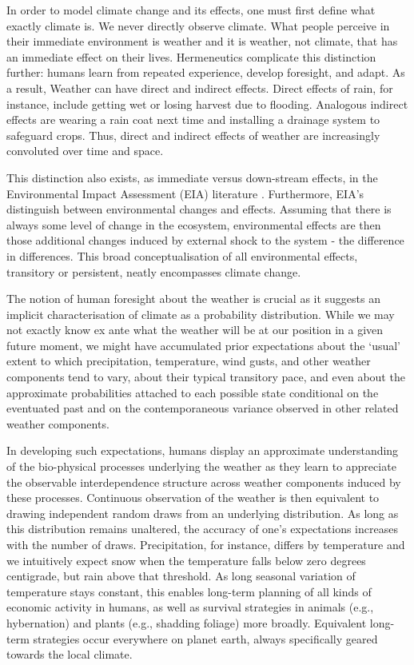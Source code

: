 \documentclass[a4paper,12pt]{article}
\theoremstyle{plain}
\theoremstyle{definition}
\theoremstyle{definition}
\theoremstyle{definition}
\theoremstyle{definition}
\begin{document}
In order to model climate change and its effects, one must first define what exactly climate is. We never directly observe climate. What people perceive in their immediate environment is weather and it is weather, not climate, that has an immediate effect on their lives. Hermeneutics complicate this distinction further: humans learn from repeated experience, develop foresight, and adapt. As a result, Weather can have direct and indirect effects. Direct effects of rain, for instance, include getting wet or losing harvest due to flooding. Analogous indirect effects are wearing a rain coat next time and installing a drainage system to safeguard crops. Thus, direct and indirect effects of weather are increasingly convoluted over time and space.

This distinction also exists, as immediate versus down-stream effects, in the Environmental Impact Assessment (EIA) literature  \citep[see e.g.,][]{Noble2015}. Furthermore, EIA's distinguish between environmental changes and effects. Assuming that there is always some level of change in the ecosystem, environmental effects are then those additional changes induced by external shock to the system - the difference in differences. This broad conceptualisation of all environmental effects, transitory or persistent, neatly encompasses climate change.

The notion of human foresight about the weather is crucial as it suggests an implicit characterisation of climate as a probability distribution. While we may not exactly know ex ante what the weather will be at our position in a given future moment, we might have accumulated prior expectations about the `usual' extent to which precipitation, temperature, wind gusts, and other weather components tend to vary, about their typical transitory pace, and even about the approximate probabilities attached to each possible state conditional on the eventuated past and on the contemporaneous variance observed in other related weather components.

In developing such expectations, humans display an approximate understanding of the bio-physical processes underlying the weather as they learn to appreciate the observable interdependence structure across weather components induced by these processes. Continuous observation of the weather is then equivalent to drawing independent random draws from an underlying distribution. As long as this distribution remains unaltered, the accuracy of one's expectations increases with the number of draws. Precipitation, for instance, differs by temperature and we intuitively expect snow when the temperature falls below zero degrees centigrade, but rain above that threshold. As long seasonal variation of temperature stays constant, this enables long-term planning of all kinds of economic activity in humans, as well as survival strategies in animals (e.g., hybernation) and plants (e.g., shadding foliage) more broadly. Equivalent long-term strategies occur everywhere on planet earth, always specifically geared towards the local climate.
\end{document}
